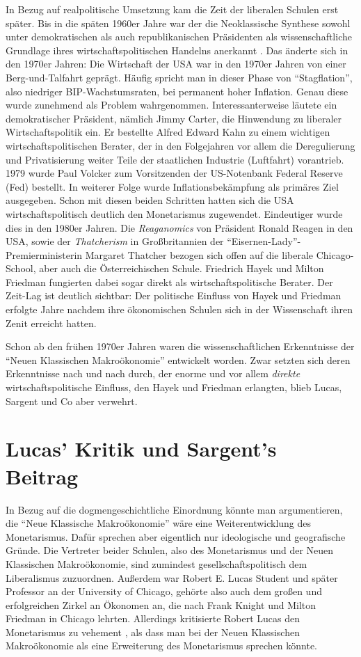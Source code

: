 In Bezug auf realpolitische Umsetzung kam die Zeit der liberalen Schulen erst später. Bis in die späten 1960er Jahre war der die Neoklassische Synthese sowohl unter demokratischen als auch republikanischen Präsidenten als wissenschaftliche Grundlage ihres wirtschaftspolitischen Handelns anerkannt \parencite[S. 12]{Woodford1999}. Das änderte sich in den 1970er Jahren: Die Wirtschaft der USA war in den 1970er Jahren von einer Berg-und-Talfahrt geprägt. Häufig spricht man in dieser Phase von "`Stagflation"', also niedriger BIP-Wachstumsraten, bei permanent hoher Inflation. Genau diese wurde zunehmend als Problem wahrgenommen. Interessanterweise läutete ein demokratischer Präsident, nämlich Jimmy Carter, die Hinwendung zu liberaler Wirtschaftspolitik ein. Er bestellte Alfred Edward Kahn zu einem wichtigen wirtschaftspolitischen Berater, der in den Folgejahren vor allem die Deregulierung und Privatisierung weiter Teile der staatlichen Industrie (Luftfahrt) vorantrieb. 1979 wurde Paul Volcker zum Vorsitzenden der US-Notenbank Federal Reserve (Fed) bestellt. In weiterer Folge wurde Inflationsbekämpfung als primäres Ziel ausgegeben. Schon mit diesen beiden Schritten hatten sich die USA wirtschaftspolitisch deutlich den Monetarismus zugewendet. Eindeutiger wurde dies in den 1980er Jahren. Die \textit{Reaganomics} von Präsident Ronald Reagen in den USA, sowie der \textit{Thatcherism} in Großbritannien der "`Eisernen-Lady"'-Premierministerin Margaret Thatcher bezogen sich offen auf die liberale Chicago-School, aber auch die Österreichischen Schule. Friedrich Hayek und Milton Friedman fungierten dabei sogar direkt als wirtschaftspolitische Berater. Der Zeit-Lag ist deutlich sichtbar: Der politische Einfluss von Hayek und Friedman erfolgte Jahre nachdem ihre ökonomischen Schulen sich in der Wissenschaft ihren Zenit erreicht hatten.

Schon ab den frühen 1970er Jahren waren die wissenschaftlichen Erkenntnisse der "`Neuen Klassischen Makroökonomie"' entwickelt worden. Zwar setzten sich deren Erkenntnisse nach und nach durch, der enorme und vor allem \textit{direkte} wirtschaftspolitische Einfluss, den Hayek und Friedman erlangten, blieb Lucas, Sargent und Co aber verwehrt.



\section{Lucas' Kritik und Sargent's Beitrag}
In Bezug auf die dogmengeschichtliche Einordnung könnte man argumentieren, die "`Neue Klassische Makroökonomie"' wäre eine Weiterentwicklung des Monetarismus. Dafür sprechen aber eigentlich nur ideologische und geografische Gründe. Die Vertreter beider Schulen, also des Monetarismus und der Neuen Klassischen Makroökonomie, sind zumindest gesellschaftspolitisch dem Liberalismus zuzuordnen. Außerdem war Robert E. Lucas Student und später Professor an der University of Chicago, gehörte also auch dem großen und erfolgreichen Zirkel an Ökonomen an, die nach Frank Knight und Milton Friedman in Chicago lehrten. Allerdings kritisierte Robert Lucas den Monetarismus zu vehement \parencite[S. 121]{Lucas1972}, als dass man bei der Neuen Klassischen Makroökonomie als eine Erweiterung des Monetarismus sprechen könnte.  

